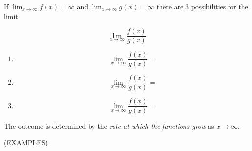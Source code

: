 \documentclass[11pt]{article}
\begin{document}
\pagebreak

If $\lim_{x\to \infty}f(x) = \infty$ and $\lim_{x\to \infty}g(x) = \infty$ there are
3 possibilities for the limit

\begin{displaymath} 
\lim_{x\to \infty}\frac{f(x)}{g(x)} 
  \end{displaymath}

\begin{enumerate}
\item{\begin{displaymath} 
\lim_{x\to \infty}\frac{f(x)}{g(x)} =
  \end{displaymath}
}
  
  \vspace{0.2in}
  
\item{\begin{displaymath} 
\lim_{x\to \infty}\frac{f(x)}{g(x)} =
  \end{displaymath}
}
  
  \vspace{0.2in}
  
\item{\begin{displaymath} 
\lim_{x\to \infty}\frac{f(x)}{g(x)} =
  \end{displaymath}
}

  \vspace{0.2in}
  
  \end{enumerate}


The outcome is determined by the \emph{rate at which the functions grow} as $x \to \infty$.

  \vspace{0.2in}
(EXAMPLES)
\end{document}

